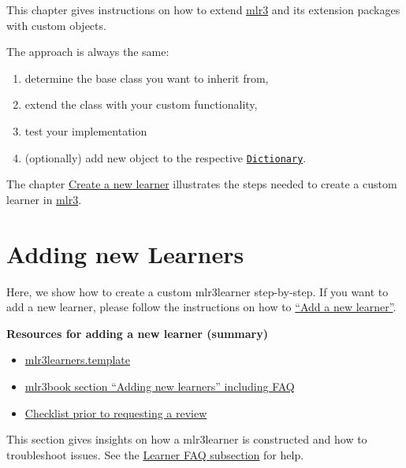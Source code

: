 \documentclass[]{scrbook}
\providecommand{\tightlist}{%
  \setlength{\itemsep}{0pt}\setlength{\parskip}{0pt}}
\begin{document}
This chapter gives instructions on how to extend \href{https://mlr3.mlr-org.com}{mlr3} and its extension packages with custom objects.

The approach is always the same:

\begin{enumerate}
\def\labelenumi{\arabic{enumi}.}
\tightlist
\item
  determine the base class you want to inherit from,
\item
  extend the class with your custom functionality,
\item
  test your implementation
\item
  (optionally) add new object to the respective \href{https://mlr3misc.mlr-org.com/reference/Dictionary.html}{\texttt{Dictionary}}.
\end{enumerate}

The chapter \protect\hyperlink{extending-learners}{Create a new learner} illustrates the steps needed to create a custom learner in \href{https://mlr3.mlr-org.com}{mlr3}.

\hypertarget{extending-learners}{%
\section{Adding new Learners}\label{extending-learners}}

Here, we show how to create a custom mlr3learner step-by-step.
If you want to add a new learner, please follow the instructions on how to \href{https://github.com/mlr-org/mlr3learners\#requestingadding-additional-learners}{``Add a new learner''}.

\textbf{Resources for adding a new learner (summary)}

\begin{itemize}
\tightlist
\item
  \href{https://github.com/mlr-org/mlr3learners.template}{mlr3learners.template}
\item
  \href{https://mlr3book.mlr-org.com/extending-learners.html}{mlr3book section ``Adding new learners'' including FAQ}
\item
  \href{https://github.com/mlr-org/mlr3learners.template/issues/5}{Checklist prior to requesting a review}
\end{itemize}

This section gives insights on how a mlr3learner is constructed and how to troubleshoot issues.
See the \protect\hyperlink{learner-faq}{Learner FAQ subsection} for help.
\end{document}
